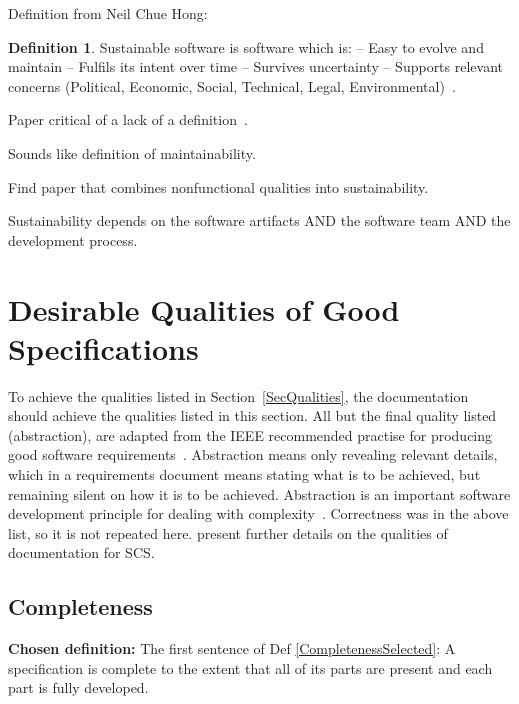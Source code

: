 \documentclass[letterpaper,cleveref]{lipics-v2019}
\theoremstyle{definition}
\newtheorem{defn}{Definition}
\begin{document}
Definition from Neil Chue Hong:
\begin{defn}
Sustainable software is software which is:
-- Easy to evolve and maintain
-- Fulfils its intent over time
-- Survives uncertainty
-- Supports relevant concerns (Political, Economic, Social, Technical,
Legal, Environmental)~\cite{Katz2016}.
\end{defn}

Paper critical of a lack of a definition~\cite{VentersEtAl2014}.

Sounds like definition of maintainability.

Find paper that combines nonfunctional qualities into sustainability.

Sustainability depends on the software artifacts AND the software team AND the
development process.

\section{Desirable Qualities of Good Specifications} \label{SecDesirableQs}

To achieve the qualities listed in Section~\ref{SecQualities}, the documentation
should achieve the qualities listed in this section.  All but the final quality
listed (abstraction), are adapted from the IEEE recommended practise for
producing good software requirements~\cite{IEEE1998}.  Abstraction means only
revealing relevant details, which in a requirements document means stating what
is to be achieved, but remaining silent on how it is to be achieved.
Abstraction is an important software development principle for dealing with
complexity~\cite[p.~40]{GhezziEtAl2003}.  Correctness was in the above list, so
it is not repeated here.  \citet{SmithAndKoothoor2016} present further details
on the qualities of documentation for SCS.

\subsection{Completeness}
\noindent \textbf{Chosen definition:} The first sentence of Def \ref{CompletenessSelected}: A specification is complete to the extent that all of its parts are present and each part is fully developed.
\end{document}
